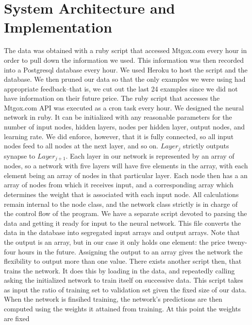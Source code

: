 \documentclass[a4paper,11pt]{article}
\begin{document}
\section{System Architecture and Implementation}
The data was obtained with a ruby script that accessed Mtgox.com every hour in order to pull down the information we used.
This information was then recorded into a Postgresql database every hour.  We used Heroku to host the script and the database.
We then pruned our data so that the only examples we were using had appropriate feedback--that is, we cut out the last 24 examples
since we did not have information on their future price.  The ruby script that accesses the Mtgox.com API was executed as a cron
task every hour.  
\newline \newline We designed the neural network in ruby.  It can be initialized with any reasonable parameters
for the number of input nodes, hidden layers, nodes per hidden layer, output nodes, and learning rate.  We did enforce, however,
that it is fully connected, so all input nodes feed to all nodes at the next layer, and so on.  $Layer_{j}$ strictly outputs
synapse to $Layer_{j + 1}$.  Each layer in our network is represented by an array of nodes, so a network with five layers
will have five elements in the array, with each element being an array of nodes in that particular layer.  Each node then
has a an array of nodes from which it receives input, and a corresponding array which determines the weight that is associated
with each input node.  All calculations remain internal to the node class, and the network class strictly is in charge
of the control flow of the program.
\newline \newline
We have a separate script devoted to parsing the data and getting it ready for input to the neural network.  This file converts
the data in the database into segregated input arrays and output arrays.  Note that the output is an array, but in our case it
only holds one element: the price tweny-four hours in the future.  Assigning the output to an array gives the network the
flexibility to output more than one value.  There exists another script then, that trains the network.  It does this by loading
in the data, and repeatedly calling asking the initialized network to train itself on successive data.  This script takes
as input the ratio of training set to validation set given the fixed size of our data.  When the network is finsihed training,
the network's predictions are then computed using the weights it attained from training.  At this point the weights are fixed
\end{document}
